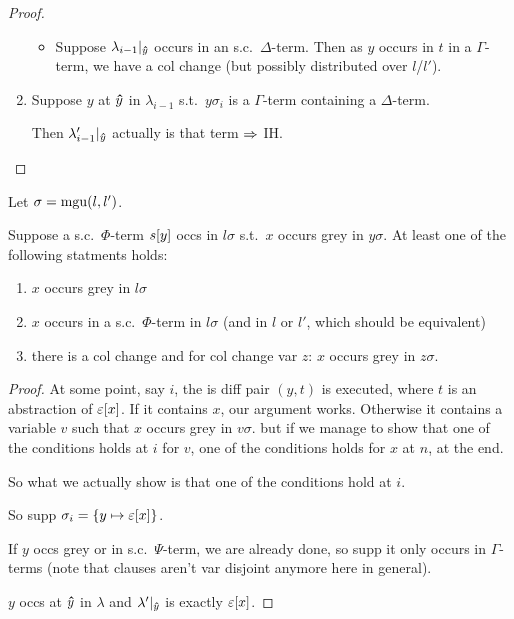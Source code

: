 \documentclass[,%
	paper=a4,%
	DIV11, %
	twoside=false,%
	liststotoc,
	bibtotoc,
	draft=false,%
	numbers=noendperiod
]{scrartcl}
\begin{document}
\begin{proof}
\begin{enumerate}
\begin{itemize}
						\item
							Suppose $\lambda_{i-1}|_{\bm\hat y}$ occurs in an s.c.\ $\Delta$-term.
							Then as $y$ occurs in $t$ in a $\Gamma$-term, we have a col change (but possibly distributed over $l$/$l'$).
				\end{itemize}


			\item
				Suppose $y$ at $\bm\hat y$ in $\lambda_{i-1}$ s.t.\ $y\sigma_i$ is a $\Gamma$-term containing a $\Delta$-term.

				Then $\lambda'_{i-1}|_{\bm\hat y}$ actually is that term $\Rightarrow$ IH. 
	\end{enumerate}
\end{proof}

\begin{clemma}
	Let $\sigma = \operatorname{mgu}(l, l')$.

	Suppose a s.c.\ $\Phi$-term $s[y]$ occs in $l\sigma$ s.t.\ $x$ occurs grey in $y\sigma$.
	At least one of the following statments holds:

	\begin{enumerate}
			\item $x$ occurs grey in $l\sigma$
			\item $x$ occurs in a s.c.\ $\Phi$-term in $l\sigma$ (and in $l$ or $l'$, which should be equivalent)
			\item there is a col change and for col change var $z$: $x$ occurs grey in $z\sigma$.
	\end{enumerate}

\end{clemma}
\begin{proof}
	At some point, say $i$, the is diff pair $(y, t)$ is executed, where $t$ is an abstraction of $\varepsilon[x]$. 
	If it contains $x$, our argument works.
	Otherwise it contains a variable $v$ such that $x$ occurs grey in $v\sigma$.
	but if we manage to show that one of the conditions holds at $i$ for $v$, one of the conditions holds for $x$ at $n$, at the end.

	So what we actually show is that one of the conditions hold at $i$.

	So supp $\sigma_i = \{ y \mapsto \varepsilon[x] \}$.

	If $y$ occs grey or in s.c.\ $\Psi$-term, we are already done, so supp it only occurs in $\Gamma$-terms (note that clauses aren't var disjoint anymore here in general).

	$y$ occs at $\bm\hat y$ in $\lambda$ and $\lambda'|_{\bm\hat y}$ is exactly $\varepsilon[x]$.
	


\end{proof}
\end{document}

